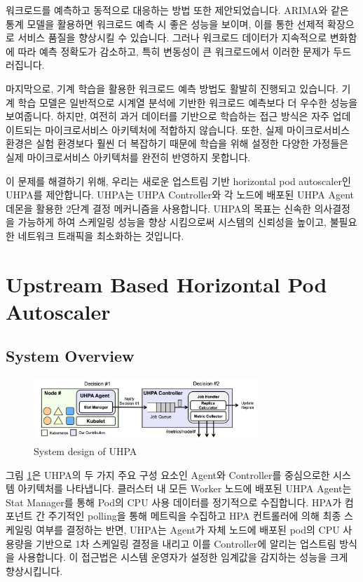 \documentclass[conference]{IEEEtran}
\begin{document}
워크로드를 예측하고 동적으로 대응하는 방법 또한 제안되었습니다. ARIMA와 같은 통계 모델을 활용하면 워크로드 예측 시 좋은 성능을 보이며, 이를 통한 선제적 확장으로 서비스 품질을 향상시킬 수 있습니다\cite{he2020novel}\cite{zhao2019research}. 그러나 워크로드 데이터가 지속적으로 변화함에 따라 예측 정확도가 감소하고, 특히 변동성이 큰 워크로드에서 이러한 문제가 두드러집니다\cite{yunyun2022research}.

마지막으로, 기계 학습을 활용한 워크로드 예측 방법도 활발히 진행되고 있습니다\cite{dang2021deep}\cite{gan2021sage}. 기계 학습 모델은 일반적으로 시계열 분석에 기반한 워크로드 예측보다 더 우수한 성능을 보여줍니다\cite{shim2023predictive}. 하지만, 여전히 과거 데이터를 기반으로 학습하는 접근 방식은 자주 업데이트되는 마이크로서비스 아키텍처에 적합하지 않습니다. 또한, 실제 마이크로서비스 환경은 실험 환경보다 훨씬 더 복잡하기 때문에 학습을 위해 설정한 다양한 가정들은 실제 마이크로서비스 아키텍처를 완전히 반영하지 못합니다\cite{huye2023lifting}.

이 문제를 해결하기 위해, 우리는 새로운 업스트림 기반 horizontal pod autoscaler인 UHPA를 제안합니다. UHPA는 UHPA Controller와 각 노드에 배포된 UHPA Agent 데몬을 활용한 2단계 결정 메커니즘을 사용합니다. UHPA의 목표는 신속한 의사결정을 가능하게 하여 스케일링 성능을 향상 시킴으로써 시스템의 신뢰성을 높이고, 불필요한 네트워크 트래픽을 최소화하는 것입니다.




\section{Upstream Based Horizontal Pod Autoscaler}
\subsection{System Overview}

\begin{figure}[tb]
    \centerline{\includegraphics[width=8.5cm]{images/approch/uhpa_system_design.png}}
    \caption{System design of UHPA}
    \label{fig:uhpa system design}
\end{figure}

그림 \ref{fig:uhpa system design}은 UHPA의 두 가지 주요 구성 요소인 Agent와 Controller를 중심으로한 시스템 아키텍처를 나타냅니다. 클러스터 내 모든 Worker 노드에 배포된 UHPA Agent는 Stat Manager를 통해 Pod의 CPU 사용 데이터를 정기적으로 수집합니다. HPA가 컴포넌트 간 주기적인 polling을 통해 메트릭을 수집하고 HPA 컨트롤러에 의해 최종 스케일링 여부를 결정하는 반면, UHPA는 Agent가 자체 노드에 배포된 pod의 CPU 사용량을 기반으로 1차 스케일링 결정을 내리고 이를 Controller에 알리는 업스트림 방식을 사용합니다. 이 접근법은 시스템 운영자가 설정한 임계값을 감지하는 성능을 크게 향상시킵니다.
\end{document}
